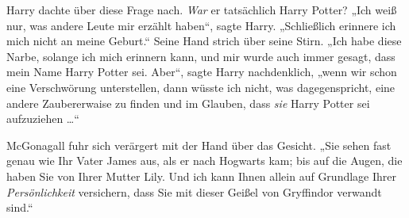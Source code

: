 Harry dachte über diese Frage nach. \emph{War} er tatsächlich Harry Potter?
„Ich weiß nur, was andere Leute mir erzählt haben“, sagte Harry.
„Schließlich erinnere ich mich nicht an meine Geburt.“ Seine Hand strich über seine Stirn.
„Ich habe diese Narbe, solange ich mich erinnern kann, und mir wurde auch immer gesagt, dass mein Name Harry Potter sei. Aber“, sagte Harry nachdenklich, „wenn wir schon eine Verschwörung unterstellen, dann wüsste ich nicht, was dagegenspricht, eine andere Zaubererwaise zu finden und im Glauben, dass \emph{sie} Harry Potter sei aufzuziehen …“

McGonagall fuhr sich verärgert mit der Hand über das Gesicht.
„Sie sehen fast genau wie Ihr Vater James aus, als er nach Hogwarts kam; bis auf die Augen, die haben Sie von Ihrer Mutter Lily. Und ich kann Ihnen allein auf Grundlage Ihrer \emph{Persönlichkeit} versichern, dass Sie mit dieser Geißel von Gryffindor verwandt sind.“

